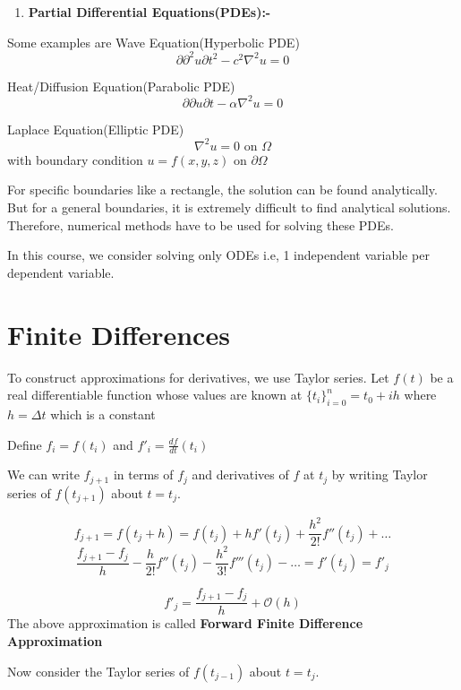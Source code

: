 \documentclass[
]{book}
\providecommand{\tightlist}{%
  \setlength{\itemsep}{0pt}\setlength{\parskip}{0pt}}
\begin{document}
\begin{enumerate}
  \begin{enumerate}
  \def\labelenumii{\alph{enumii}.}
  \setcounter{enumii}{1}
  \tightlist
  \item
    \textbf{Partial Differential Equations(PDEs):-}
  \end{enumerate}

  Some examples are Wave Equation(Hyperbolic PDE)
  \[\partial{\partial^2 u}{\partial t^2}-c^2 \nabla^2 u= 0\]

  Heat/Diffusion Equation(Parabolic PDE)
  \[\partial{\partial u}{\partial t}-\alpha \nabla^2 u= 0\]

  Laplace Equation(Elliptic PDE)
  \[\nabla^2 u = 0 \text{ on } \Omega\]
  with boundary condition \(u = f(x,y,z)\) on \(\partial \Omega\)

  For specific boundaries like a rectangle, the solution can be found analytically. But for a general boundaries, it is extremely difficult to find analytical solutions. Therefore, numerical methods have to be used for solving these PDEs.
\end{enumerate}

In this course, we consider solving only ODEs i.e, 1 independent variable per dependent variable.

\hypertarget{finite-differences}{%
\section{Finite Differences}\label{finite-differences}}

To construct approximations for derivatives, we use Taylor series. Let \(f(t)\) be a real differentiable function whose values are known at \(\{t_i\}_{i=0}^n=t_0+i h\) where \(h = \Delta t\) which is a constant

Define \(f_i = f(t_i)\) and \(f'_i = \frac{df}{dt}(t_i)\)

We can write \(f_{j+1}\) in terms of \(f_j\) and derivatives of \(f\) at \(t_j\) by writing Taylor series of \(f(t_{j+1})\) about \(t=t_j\).

\[f_{j+1} = f(t_j+h)= f(t_j)+hf'(t_j)+\frac{h^2}{2!}f''(t_j)+\dots\]
\[\dfrac{f_{j+1}-f_j}{h}-\frac{h}{2!}f''(t_j)-\frac{h^2}{3!}f'''(t_j)-\dots = f'(t_j) = f'_j\]

\begin{equation}
f'_j = \dfrac{f_{j+1}-f_j}{h} + \mathcal{O}(h)
\end{equation}
The above approximation is called \textbf{Forward Finite Difference Approximation}

Now consider the Taylor series of \(f(t_{j-1})\) about \(t=t_j\).
\end{document}
